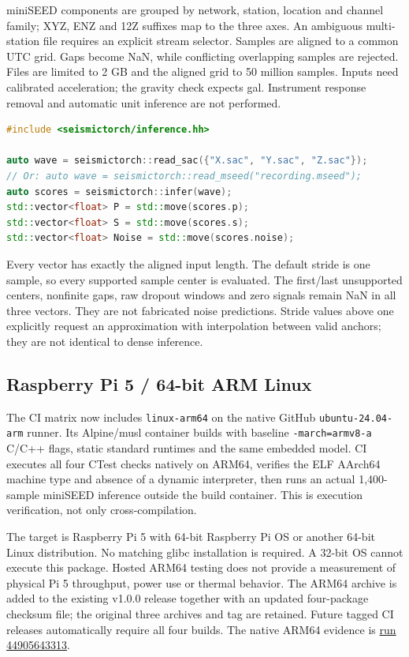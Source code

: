 \documentclass[a4paper,11pt,oneside]{article}
\newcommand{\code}[1]{\nolinkurl{#1}}
\begin{document}
miniSEED components are grouped by network, station, location and channel
family; XYZ, ENZ and 12Z suffixes map to the three axes. An ambiguous
multi-station file requires an explicit stream selector. Samples are aligned
to a common UTC grid. Gaps become NaN, while conflicting overlapping samples
are rejected. Files are limited to 2 GB and the aligned grid to 50 million
samples. Inputs need calibrated acceleration; the gravity check expects gal.
Instrument response removal and automatic unit inference are not performed.

\begin{lstlisting}[language=C++]
#include <seismictorch/inference.hh>

auto wave = seismictorch::read_sac({"X.sac", "Y.sac", "Z.sac"});
// Or: auto wave = seismictorch::read_mseed("recording.mseed");
auto scores = seismictorch::infer(wave);
std::vector<float> P = std::move(scores.p);
std::vector<float> S = std::move(scores.s);
std::vector<float> Noise = std::move(scores.noise);
\end{lstlisting}

Every vector has exactly the aligned input length. The default stride is one
sample, so every supported sample center is evaluated. The first/last
unsupported centers, nonfinite gaps, raw dropout windows and zero signals
remain NaN in all three vectors. They are not fabricated noise predictions.
Stride values above one explicitly request an approximation with interpolation
between valid anchors; they are not identical to dense inference.

\subsection{Raspberry Pi 5 / 64-bit ARM Linux}
The CI matrix now includes \code{linux-arm64} on the native GitHub
\code{ubuntu-24.04-arm} runner. Its Alpine/musl container builds with baseline
\code{-march=armv8-a} C/C++ flags, static standard runtimes and the same
embedded model. CI executes all four CTest checks natively on ARM64, verifies
the ELF AArch64 machine type and absence of a dynamic interpreter, then runs
an actual 1,400-sample miniSEED inference outside the build container.
This is execution verification, not only cross-compilation.

The target is Raspberry Pi 5 with 64-bit Raspberry Pi OS or another 64-bit
Linux distribution. No matching glibc installation is required. A 32-bit OS
cannot execute this package. Hosted ARM64 testing does not provide a
measurement of physical Pi 5 throughput, power use or thermal behavior.
The ARM64 archive is added to the existing v1.0.0 release together with an
updated four-package checksum file; the original three archives and tag are
retained. Future tagged CI releases automatically require all four builds.
The native ARM64 evidence is
\href{https://github.com/Gauss963/SeismicTorch/actions/runs/44905643313}{run 44905643313}.
\end{document}
